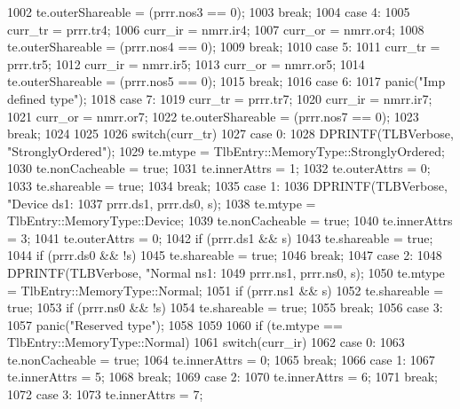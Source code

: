 \begin{DoxyCode}
{{{1002             te.outerShareable = (prrr.nos3 == 0);
1003             break;
1004           case 4:
1005             curr_tr = prrr.tr4;
1006             curr_ir = nmrr.ir4;
1007             curr_or = nmrr.or4;
1008             te.outerShareable = (prrr.nos4 == 0);
1009             break;
1010           case 5:
1011             curr_tr = prrr.tr5;
1012             curr_ir = nmrr.ir5;
1013             curr_or = nmrr.or5;
1014             te.outerShareable = (prrr.nos5 == 0);
1015             break;
1016           case 6:
1017             panic("Imp defined type\n");
1018           case 7:
1019             curr_tr = prrr.tr7;
1020             curr_ir = nmrr.ir7;
1021             curr_or = nmrr.or7;
1022             te.outerShareable = (prrr.nos7 == 0);
1023             break;
1024         }
1025 
1026         switch(curr_tr) {
1027           case 0:
1028             DPRINTF(TLBVerbose, "StronglyOrdered\n");
1029             te.mtype = TlbEntry::MemoryType::StronglyOrdered;
1030             te.nonCacheable = true;
1031             te.innerAttrs = 1;
1032             te.outerAttrs = 0;
1033             te.shareable = true;
1034             break;
1035           case 1:
1036             DPRINTF(TLBVerbose, "Device ds1:%
1037                     prrr.ds1, prrr.ds0, s);
1038             te.mtype = TlbEntry::MemoryType::Device;
1039             te.nonCacheable = true;
1040             te.innerAttrs = 3;
1041             te.outerAttrs = 0;
1042             if (prrr.ds1 && s)
1043                 te.shareable = true;
1044             if (prrr.ds0 && !s)
1045                 te.shareable = true;
1046             break;
1047           case 2:
1048             DPRINTF(TLBVerbose, "Normal ns1:%
1049                     prrr.ns1, prrr.ns0, s);
1050             te.mtype = TlbEntry::MemoryType::Normal;
1051             if (prrr.ns1 && s)
1052                 te.shareable = true;
1053             if (prrr.ns0 && !s)
1054                 te.shareable = true;
1055             break;
1056           case 3:
1057             panic("Reserved type");
1058         }
1059 
1060         if (te.mtype == TlbEntry::MemoryType::Normal){
1061             switch(curr_ir) {
1062               case 0:
1063                 te.nonCacheable = true;
1064                 te.innerAttrs = 0;
1065                 break;
1066               case 1:
1067                 te.innerAttrs = 5;
1068                 break;
1069               case 2:
1070                 te.innerAttrs = 6;
1071                 break;
1072               case 3:
1073                 te.innerAttrs = 7;
}}}}
\end{DoxyCode}
